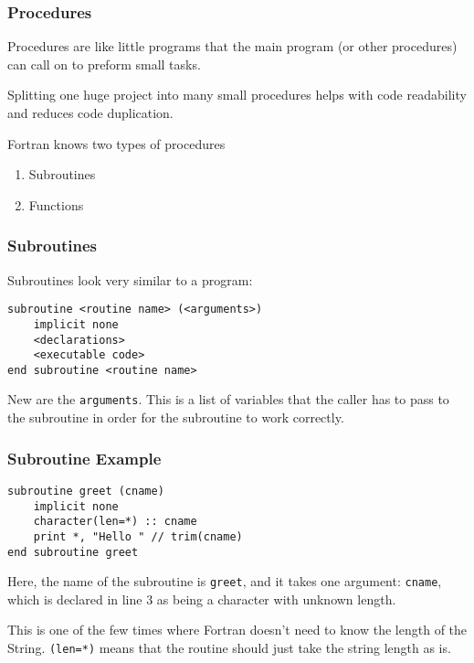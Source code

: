 
\begin{frame}[fragile]
  \frametitle{Procedures}

  Procedures are like little programs that the
  main program (or other procedures) can call on
  to preform small tasks.

  Splitting one huge project into many small procedures
  helps with code readability and reduces code duplication.

  Fortran knows two types of procedures

  \begin{enumerate}
    \item Subroutines
    \item Functions
  \end{enumerate}

\end{frame}

\begin{frame}[fragile]
  \frametitle{Subroutines}

  Subroutines look very similar to a program:

  \begin{lstlisting}
subroutine <routine name> (<arguments>)
    implicit none
    <declarations>
    <executable code>
end subroutine <routine name>
  \end{lstlisting}

  New are the \texttt{arguments}. 
  This is a list of variables that the caller has to pass to the
  subroutine in order for the subroutine to work correctly.

\end{frame}

\begin{frame}[fragile]
  \frametitle{Subroutine Example}

  \begin{lstlisting}
subroutine greet (cname)
    implicit none
    character(len=*) :: cname
    print *, "Hello " // trim(cname)
end subroutine greet
  \end{lstlisting}

  Here, the name of the subroutine is \texttt{greet}, and it takes one argument:
  \texttt{cname}, which is declared in line 3 as being a character with unknown length.

  This is one of the few times where Fortran doesn't need to know the length of the
  String. 
  \texttt{(len=*)} means that the routine should just take the string length as is.

\end{frame}


